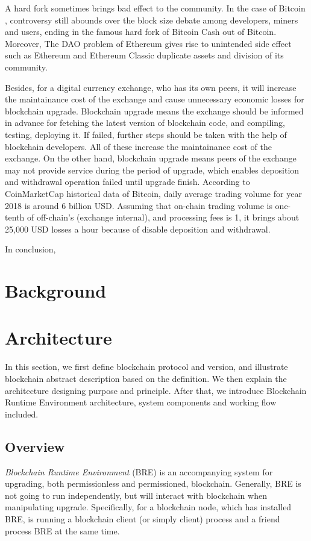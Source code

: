 \documentclass[sigplan,screen]{acmart}
\begin{document}
A hard fork sometimes brings bad effect to the community.
In the case of Bitcoin \cite{bitcoin}, controversy still abounds over the block
size debate among developers, miners and users, ending in the famous hard fork
of Bitcoin Cash \cite{bitcoincash} out of Bitcoin.
Moreover, The DAO problem \cite{thedaowikidef} of Ethereum \cite{ethereum}
gives rise to unintended side effect such as Ethereum and Ethereum Classic
\cite{ethereumclassic} duplicate assets and division of its community.

Besides, for a digital currency exchange, who has its own peers, it will
increase the maintainance cost of the exchange and cause unnecessary economic
losses for blockchain upgrade.
Blockchain upgrade means the exchange should be informed in
advance for fetching the latest version of blockchain code, and compiling,
testing, deploying it. If failed, further steps should be taken with the
help of blockchain developers. All of these increase the maintainance cost of
the exchange.
On the other hand, blockchain upgrade means peers of the exchange may not
provide service during the period of upgrade, which enables deposition and
withdrawal operation failed until upgrade finish.
According to CoinMarketCap \cite{coinmarketcap} historical data of Bitcoin,
daily average trading volume for year 2018 is around 6 billion USD.
Assuming that on-chain trading volume is one-tenth of off-chain's (exchange
internal), and processing fees is 1\textperthousand, it brings about 25,000 USD
losses a hour because of disable deposition and withdrawal.

In conclusion,

\section{Background}

\section{Architecture}
In this section, we first define blockchain protocol and version, and illustrate
blockchain abstract description based on the definition. We then explain the
architecture designing purpose and principle. After that, we introduce Blockchain
Runtime Environment architecture, system components and working flow included.

\subsection{Overview}
\textit{Blockchain Runtime Environment} (BRE) is an accompanying system for upgrading,
both permissionless and permissioned, blockchain.
Generally, BRE is not going to
run independently, but will interact with blockchain when manipulating
upgrade. Specifically, for a blockchain node, which has installed BRE, is
running a blockchain client (or simply client) process and a friend process BRE
at the same time.
\end{document}
